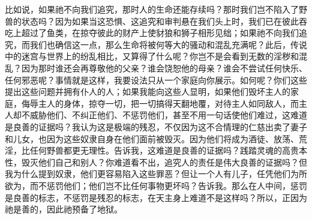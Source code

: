 比如说，如果祂不向我们追究，那时人的生命还能存续吗？\newline{}那时我们岂不陷入了野兽的状态吗？\newline{}因为如果当这恐惧、这追究和审判悬在我们头上时，我们已在彼此吞吃上超过了鱼类，在掠夺彼此的财产上使豺狼和狮子相形见绌；\newline{}如果祂不向我们追究，而我们也确信这一点，那么生命将被何等大的骚动和混乱充满呢？\newline{}此后，传说中的迷宫与世界上的纷乱相比，又算得了什么呢？\newline{}你岂不是会看到无数的淫秽和混乱？\newline{}因为那时谁还会再尊敬他的父亲？谁会饶恕他的母亲？谁会不尝试任何快乐、任何邪恶呢？\newline{}事情就是这样，我要设法只从一个家庭向你展示。如何呢？\newline{}你们这些提出这些问题并拥有仆人的人；如果我能向这些人显明，如果他们毁坏主人的家庭，侮辱主人的身体，掠夺一切，把一切搞得天翻地覆，对待主人如同敌人，而主人却不威胁他们、不纠正他们、不惩罚他们，甚至不用一句话使他们难过，这难道是良善的证据吗？\newline{}我认为这是极端的残忍，不仅因为这不合情理的仁慈出卖了妻子和儿女，也因为这些奴隶自身在他们面前被毁灭。\newline{}因为他们将成为酒徒、放荡、荒淫，比任何野兽都更无理性。\newline{}告诉我，这难道是良善的证据吗？践踏灵魂的高贵本性，毁灭他们自己和别人？\newline{}你难道看不出，追究人的责任是伟大良善的证据吗？\newline{}但我为什么提到奴隶，他们更容易陷入这些罪恶？\newline{}但让一个人有儿子，任凭他们为所欲为，而不惩罚他们；他们岂不比任何事物更坏吗？\newline{}告诉我。那么在人中间，惩罚是良善的标志，不惩罚是残忍的标志，在天主身上难道不是这样吗？\newline{}所以，正因为祂是善的，因此祂预备了地狱。\par

